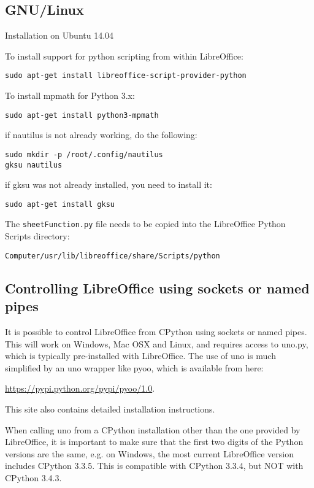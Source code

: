 \subsection{GNU/Linux}
Installation on Ubuntu 14.04

To install support for python scripting from within LibreOffice:
\begin{verbatim}
sudo apt-get install libreoffice-script-provider-python
\end{verbatim}

To install mpmath for Python 3.x:
\begin{verbatim}
sudo apt-get install python3-mpmath
\end{verbatim}

if nautilus is not already working, do the following:
\begin{verbatim}
sudo mkdir -p /root/.config/nautilus
gksu nautilus
\end{verbatim}

if gksu was not already installed, you need to install it:
\begin{verbatim}
sudo apt-get install gksu
\end{verbatim}

The \verb|sheetFunction.py| file needs to be copied into the LibreOffice Python Scripts directory:
\begin{verbatim}
Computer/usr/lib/libreoffice/share/Scripts/python
\end{verbatim}


\subsection{Controlling LibreOffice using sockets or named pipes}
It is possible to control LibreOffice from CPython using sockets or named pipes. This will work on Windows, Mac OSX and Linux, and requires access to uno.py, which is typically pre-installed with LibreOffice. The use of uno is much simplified by an uno wrapper like pyoo, which is available from here:

\vpara
\href{https://pypi.python.org/pypi/pyoo/1.0}{https://pypi.python.org/pypi/pyoo/1.0}. 

This site also contains detailed installation instructions. 

\vpara
When calling uno from a CPython installation other than the one provided by LibreOffice, it is important to make sure that the first two digits of the Python versions are the same, e.g. on Windows, the most current LibreOffice version includes CPython 3.3.5. This is compatible with CPython 3.3.4, but NOT with CPython 3.4.3.


